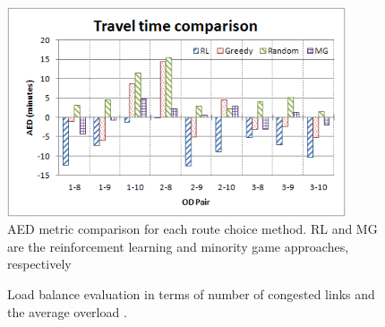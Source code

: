 \documentclass{RITA}
\begin{document}
\begin{figure}[ht]
    \centerline{\includegraphics[width=10cm]{img/travelTimeComparison-hatched.png}}
    \caption{AED metric comparison for each route choice method. RL and MG are the reinforcement learning and minority game approaches, respectively}
    \label{fig:travelTimeComparison}
\end{figure}

\begin{figure}[ht]
  \centering
  \caption{Load balance evaluation in terms of number of congested links  and the average overload .}
  \label{fig:loadBalance}
\end{figure}
\end{document}
